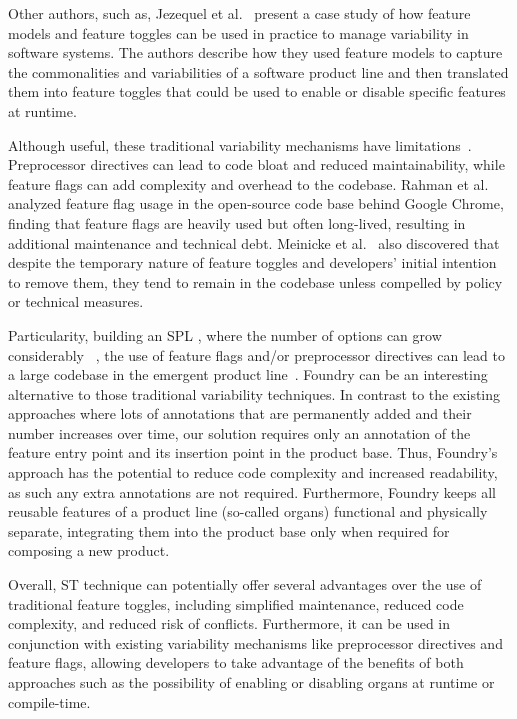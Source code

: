 Other authors, such as, Jezequel et al.~\cite{Jezequel2022} present a case study of how feature models and feature toggles can be used in practice to manage variability in software systems. The authors describe how they used feature models to capture the commonalities and variabilities of a software product line and then translated them into feature toggles that could be used to enable or disable specific features at runtime.

Although useful, these traditional variability mechanisms have limitations~\cite{Bachmann2005, Liebig2010}. Preprocessor directives can lead to code bloat and reduced maintainability, while feature flags can add complexity and overhead to the codebase. Rahman et al.~\cite{Rahman2016} analyzed feature flag usage in the open-source code base behind Google Chrome, finding that feature flags are heavily used but often long-lived, resulting in additional maintenance and technical debt. Meinicke et al.~\cite{Meinicke2020} also discovered that despite the temporary nature of feature toggles and developers' initial intention to remove them, they tend to remain in the codebase unless compelled by policy or technical measures. 

Particularity, building an SPL , where the number of options can grow considerably ~\cite{Lotufo2010,Xu2015}, the use of feature flags and/or preprocessor directives can lead to a large codebase in the emergent product line~\cite{Meinicke2020}. Foundry can be an interesting alternative to those traditional variability techniques. In contrast to the existing approaches where lots of annotations that are permanently added and their number increases over time, our solution requires only an annotation of the feature entry point and its insertion point in the product base. Thus, Foundry's approach has the potential to reduce code complexity and increased readability, as such any extra annotations are not required. Furthermore, Foundry keeps all reusable features of a product line (so-called organs) functional and physically separate, integrating them into the product base only when required for composing a new product.

Overall, ST technique can potentially offer several advantages over the use of traditional feature toggles, including simplified maintenance, reduced code complexity, and reduced risk of conflicts. Furthermore, it can be used in conjunction with existing variability mechanisms like preprocessor directives and feature flags, allowing developers to take advantage of the benefits of both approaches such as the possibility of enabling or disabling organs at runtime or compile-time. 

